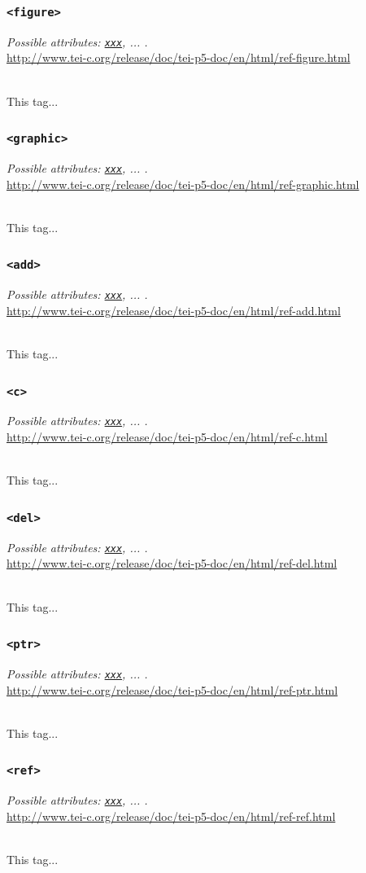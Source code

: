 \documentclass[12pt,a4paper]{article}
\newcommand{\taglinks}[2]{
\vspace*{-0.5ex}
\hspace*{\parindent}
\begin{minipage}{\textwidth}
  \emph{Possible attributes: #1.} \\ \url{#2} \end{minipage} \vspace{0.5ex} \\ }
\begin{document}
\subsubsection{\texttt{<figure>}} \label{tag-sec:figure}
\taglinks{
\hyperref[att-sec:xxx]{\texttt{xxx}}, ... }
{http://www.tei-c.org/release/doc/tei-p5-doc/en/html/ref-figure.html}
This tag...

\subsubsection{\texttt{<graphic>}} \label{tag-sec:graphic}
\taglinks{
\hyperref[att-sec:xxx]{\texttt{xxx}}, ... }
{http://www.tei-c.org/release/doc/tei-p5-doc/en/html/ref-graphic.html}
This tag...

\subsubsection{\texttt{<add>}} \label{tag-sec:add}
\taglinks{
\hyperref[att-sec:xxx]{\texttt{xxx}}, ... }
{http://www.tei-c.org/release/doc/tei-p5-doc/en/html/ref-add.html}
This tag...

\subsubsection{\texttt{<c>}} \label{tag-seccTEI}
\taglinks{
\hyperref[att-sec:xxx]{\texttt{xxx}}, ... }
{http://www.tei-c.org/release/doc/tei-p5-doc/en/html/ref-c.html}
This tag...

\subsubsection{\texttt{<del>}} \label{tag-sec:del}
\taglinks{
\hyperref[att-sec:xxx]{\texttt{xxx}}, ... }
{http://www.tei-c.org/release/doc/tei-p5-doc/en/html/ref-del.html}
This tag...

\subsubsection{\texttt{<ptr>}} \label{tag-sec:ptr}
\taglinks{
\hyperref[att-sec:xxx]{\texttt{xxx}}, ... }
{http://www.tei-c.org/release/doc/tei-p5-doc/en/html/ref-ptr.html}
This tag...

\subsubsection{\texttt{<ref>}} \label{tag-sec:ref}
\taglinks{
\hyperref[att-sec:xxx]{\texttt{xxx}}, ... }
{http://www.tei-c.org/release/doc/tei-p5-doc/en/html/ref-ref.html}
This tag...
\end{document}
